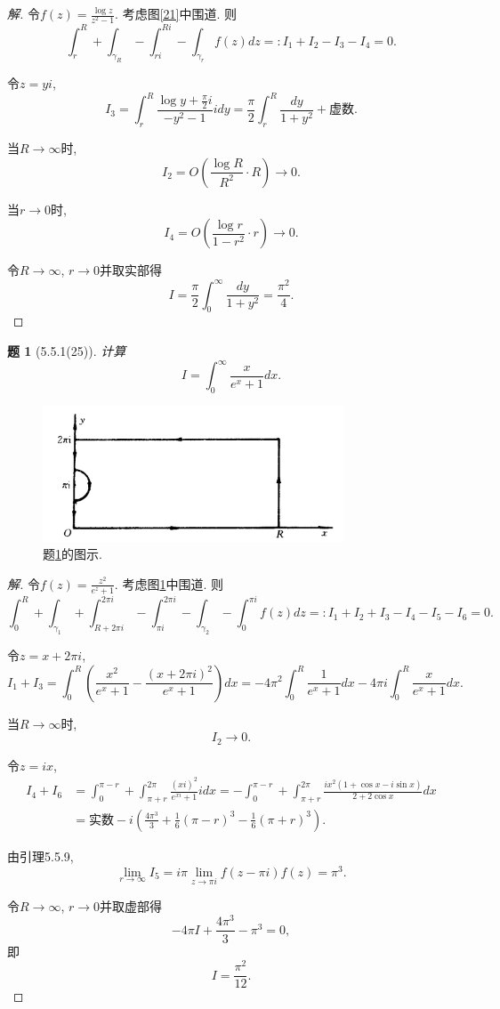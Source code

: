 \documentclass{article}[a4paper, 12pt]
\theoremstyle{mystyle}
\newtheorem{problem}{题}
\newenvironment{solution}{\begin{proof}[解]}{\end{proof}}
\begin{document}
\begin{solution}
  令\(f(z)=\frac{\log z}{z^2-1}\). 考虑图\ref{21}中围道. 则\[\int_{r}^{R}+\int_{\gamma_R}-\int_{ri}^{Ri}-\int_{\gamma_r} f(z)dz=:I_1+I_2-I_3-I_4=0.\]

  令\(z=yi\), \[I_3=\int_r^R\frac{\log y+\frac{\pi}{2}i}{-y^2-1}idy=\frac{\pi}{2}\int_r^R\frac{dy}{1+y^2}+\text{虚数}.\]

  当\(R\to\infty\)时, \[I_2=O\left(\frac{\log R}{R^2}\cdot R\right)\to0.\]

  当\(r\to0\)时, \[I_4=O\left(\frac{\log r}{1-r^2}\cdot r\right)\to0.\]

  令\(R\to\infty\), \(r\to0\)并取实部得\[I=\frac{\pi}{2}\int_0^\infty\frac{dy}{1+y^2}=\frac{\pi^2}{4}.\tag*{\(\qed\)}\]
  \renewcommand{\qedsymbol}{}
\end{solution}

\begin{problem}[5.5.1(25)] \label{25}
  计算\[I=\int_0^\infty \frac{x}{e^x+1}dx.\]
\end{problem}

\begin{figure}[htbp]
  \centering
  \includegraphics[width=0.8\textwidth]{images/25.png}
  \caption{题\ref{25}的图示.}
  \label{fig:25}
\end{figure}

\begin{solution}
  令\(f(z)=\frac{z^2}{e^z+1}\). 考虑图\ref{fig:25}中围道. 则\[\int_{0}^{R}+\int_{\gamma_1}+\int_{R+2\pi i}^{2\pi i}-\int_{\pi i}^{2\pi i}-\int_{\gamma_2}-\int_{0}^{\pi i} f(z)dz=:I_1+I_2+I_3-I_4-I_5-I_6=0.\]

  令\(z=x+2\pi i\), \[I_1+I_3=\int_0^R\left(\frac{x^2}{e^x+1}-\frac{(x+2\pi i)^2}{e^x+1}\right)dx=-4\pi^2\int_0^R\frac{1}{e^x+1}dx-4\pi i\int_0^R \frac{x}{e^x+1}dx.\]

  当\(R\to\infty\)时, \[I_2\to 0.\]

  令\(z=ix\), \begin{align*}I_4+I_6&=\int_{0}^{\pi-r}+\int_{\pi+r}^{2\pi} \frac{(xi)^2}{e^{xi}+1}idx=-\int_{0}^{\pi-r}+\int_{\pi+r}^{2\pi}\frac{ix^2(1+\cos x-i\sin x)}{2+2\cos x}dx\\&=\text{实数}-i\left(\frac{4\pi^3}{3}+\frac{1}{6}(\pi-r)^3-\frac{1}{6}(\pi+r)^3\right).\end{align*}

  由引理5.5.9, \[\lim_{r\to\infty}I_5=i\pi\lim_{z\to\pi i}f(z-\pi i)f(z)=\pi^3.\]

  令\(R\to\infty\), \(r\to0\)并取虚部得\[-4\pi I+\frac{4\pi^3}{3}-\pi^3=0,\]
  即\[I=\frac{\pi^2}{12}. \tag*{\(\qed\)}\]
  \renewcommand{\qedsymbol}{}
\end{solution}
\end{document}
